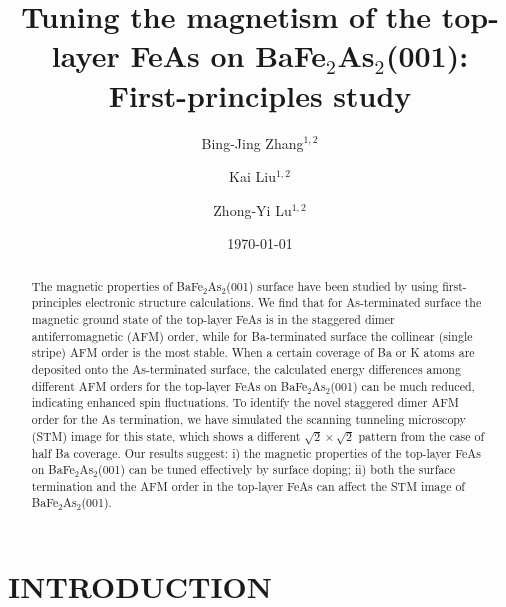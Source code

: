 \documentclass[twocolumn,aps,showpacs,prb]{revtex4-1}
\begin{document}
\title{Tuning the magnetism of the top-layer FeAs on BaFe$_{2}$As$_{2}$(001): First-principles study}
\author{Bing-Jing Zhang$^{1,2}$}
\author{Kai Liu$^{1,2}$}
\author{Zhong-Yi Lu$^{1,2}$}


\date{\today}

\begin{abstract}

The magnetic properties of BaFe$_{2}$As$_{2}$(001) surface have been studied by using first-principles electronic structure calculations. We find that for As-terminated surface the magnetic ground state of the top-layer FeAs is in the staggered dimer antiferromagnetic (AFM) order, while for Ba-terminated surface the collinear (single stripe) AFM order is the most stable. When a certain coverage of Ba or K atoms are deposited onto the As-terminated surface, the calculated energy differences among different AFM orders for the top-layer FeAs on BaFe$_{2}$As$_{2}$(001) can be much reduced, indicating enhanced spin fluctuations. To identify the novel staggered dimer AFM order for the As termination, we have simulated the scanning tunneling microscopy (STM) image for this state, which shows a different $\sqrt{2}\times\sqrt{2}$ pattern from the case of half Ba coverage. Our results suggest: i) the magnetic properties of the top-layer FeAs on BaFe$_{2}$As$_{2}$(001) can be tuned effectively by surface doping; ii) both the surface termination and the AFM order in the top-layer FeAs can affect the STM image of BaFe$_{2}$As$_{2}$(001).

\end{abstract}

\pacs{}

\maketitle


\section{INTRODUCTION}
\end{document}
